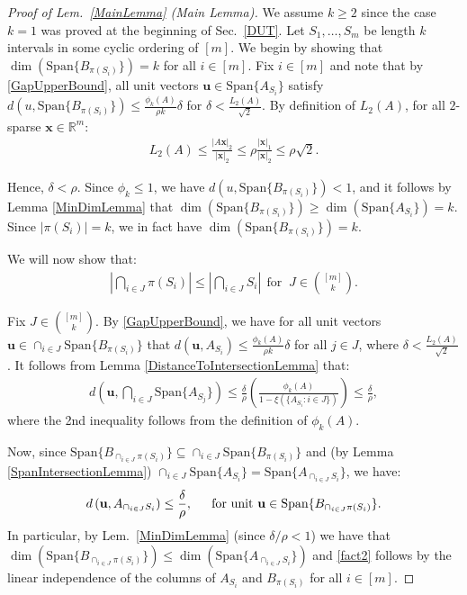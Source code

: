 \documentclass[journal, twocolumn]{IEEEtran}
\begin{document}
\begin{proof}[Proof of Lem.~\ref{MainLemma} (Main Lemma)]
We assume $k \geq 2$ since the case $k = 1$ was proved at the beginning of Sec.~\ref{DUT}. Let $S_1, \ldots, S_m$ be length $k$ intervals in some cyclic ordering of $[m]$. We begin by showing that $\dim(\text{Span}\{B_{\pi(S_i)}\}) = k$ for all $i \in [m]$. 
Fix $i \in [m]$ and note that by \eqref{GapUpperBound}, all unit vectors $\mathbf{u} \in \text{Span}\{A_{S_i}\}$ satisfy $d(u, \text{Span}\{B_{\pi(S_i)}\}) \leq \frac{\phi_k(A)}{\rho k} \delta$ for $\delta < \frac{L_2(A)}{ \sqrt{2}}$. By definition of $L_2(A)$, for all $2$-sparse $\mathbf{x} \in \mathbb{R}^m$:
\begin{align*}
L_2(A) \leq \frac{|A\mathbf{x}|_2}{|\mathbf{x}|_2} \leq \rho \frac{|\mathbf{x}|_1}{|\mathbf{x}|_2} \leq \rho \sqrt{2}.
\end{align*}

Hence, $\delta < \rho$. Since $\phi_k \leq 1$, we have $d(u, \text{Span}\{B_{\pi(S_i)}\}) < 1$, and it follows by Lemma \ref{MinDimLemma} that $\dim(\text{Span}\{B_{\pi(S_i)}\}) \geq \dim(\text{Span}\{A_{S_i}\}) = k$. Since $|\pi(S_i)| = k$, we in fact have $\dim(\text{Span}\{B_{\pi(S_i)}\}) = k$. %

We will now show that:
\begin{align}\label{fact2}
|\bigcap_{i \in J} \pi(S_i)| \leq |\bigcap_{i \in J} S_i | \ \ \text{for } \ J \in {[m] \choose k}.
\end{align}

Fix $J \in {[m] \choose k}$. By \eqref{GapUpperBound}, we have for all unit vectors $\mathbf{u} \in \cap_{i \in J} \text{Span}\{B_{\pi(S_i)}\}$ that $d(\mathbf{u}, A_{S_i}) \leq \frac{\phi_k(A)}{\rho k} \delta$ for all $j \in J$, where $\delta < \frac{L_2(A)}{\sqrt{2}}$. It follows from Lemma \ref{DistanceToIntersectionLemma} that:
\begin{align*}
d\left( \mathbf{u}, \bigcap_{i \in J} \text{Span}\{A_{S_j}\} \right) 
\leq \frac{\delta}{\rho} \left( \frac{ \phi_k(A) }{1 - \xi( \{ A_{S_i}: i \in J\} ) } \right) \leq \frac{\delta}{\rho},
\end{align*}
%
where the 2nd inequality follows from the definition of $\phi_k(A)$. 

Now, since \mbox{$\text{Span}\{B_{\cap_{i \in J}\pi(S_i)}\} \subseteq \cap_{i \in J} \text{Span}\{B_{\pi(S_i)}\}$} and (by Lemma \ref{SpanIntersectionLemma}) $\cap_{i \in J}  \text{Span}\{A_{S_i}\} = \text{Span}\{A_{\cap_{i \in J}  S_i}\}$, we have:
\begin{align}\label{fact1}
d\left( \mathbf{u}, A_{\cap_{i \in J} S_i} \right) \leq \frac{\delta}{\rho}, \indent \text{for unit } \mathbf{u} \in \text{Span}\{B_{\cap_{i \in J}\pi(S_i)}\}.
\end{align}
In particular, by Lem.~\ref{MinDimLemma} (since $\delta/\rho < 1$) we have that $\dim(\text{Span}\{B_{\cap_{i \in J}\pi(S_i)}\}) \leq \dim(\text{Span}\{A_{\cap_{i \in J} S_i}\})$ and \eqref{fact2} follows by the linear independence of the columns of $A_{S_i}$ and $B_{\pi(S_i)}$ for all $i \in [m]$.


\end{proof}
\end{document}
